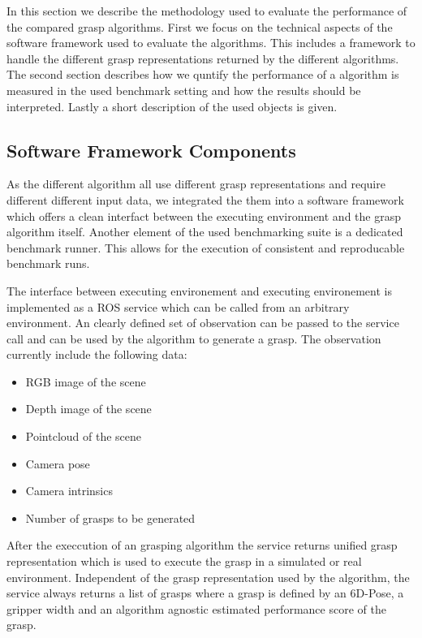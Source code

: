 In this section we describe the methodology used to evaluate the performance of the compared grasp algorithms.
First we focus on the technical aspects of the software framework used to evaluate the algorithms.
This includes a framework to handle the different grasp representations returned by the different algorithms.
The second section describes how we quntify the performance of a algorithm is measured in the used benchmark setting and how the results should be interpreted.
Lastly a short description of the used objects is given.

\subsection{Software Framework Components}
As the different algorithm all use different grasp representations and require different different input data, we integrated the them into
a software framework which offers a clean interfact between the executing environment and the grasp algorithm itself.
Another element of the used benchmarking suite is a dedicated benchmark runner. This allows for the execution of consistent and reproducable benchmark runs.

The interface between executing environement and executing environement is implemented as a ROS service which can be called from an arbitrary environment.
An clearly defined set of observation can be passed to the service call and can be used by the algorithm to generate a grasp.
The observation currently include the following data:
\begin{itemize}
    \item RGB image of the scene
    \item Depth image of the scene
    \item Pointcloud of the scene
    \item Camera pose
    \item Camera intrinsics
    \item Number of grasps to be generated
\end{itemize}
After the execcution of an grasping algorithm the service returns unified grasp representation which is used to execute the grasp in a simulated or real environment.
Independent of the grasp representation used by the algorithm, the service always returns a list of grasps where a grasp is defined by an 6D-Pose, a gripper width and
an algorithm agnostic estimated performance score of the grasp.

